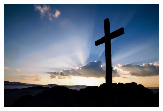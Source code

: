 \documentclass[10pt,a5paper]{article}
\begin{document}
		\begin{figure}[h]
			\centering
			\includegraphics[width=0.75\textwidth,keepaspectratio]{"FreeChristian.jpeg"}
		\end{figure}
\end{document}
